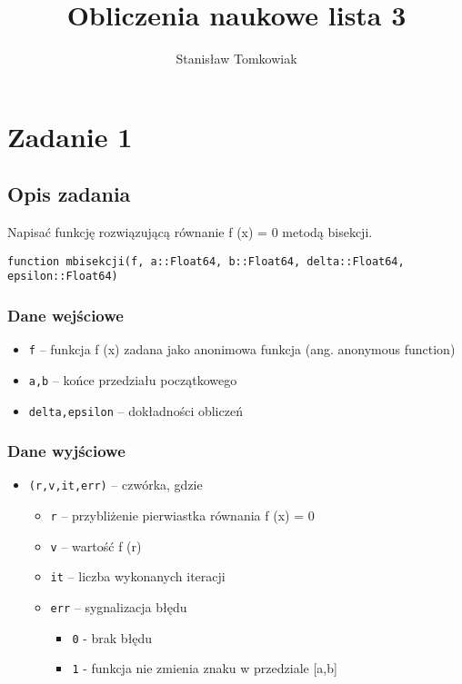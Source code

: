 \documentclass{article}
\title{Obliczenia naukowe lista 3}
\author{Stanisław Tomkowiak}
\begin{document}
\maketitle


\section*{Zadanie 1}
\subsection*{Opis zadania}
Napisać funkcję rozwiązującą równanie f (x) = 0 metodą bisekcji.

\texttt{function mbisekcji(f, a::Float64, b::Float64, delta::Float64, epsilon::Float64)}
\subsubsection*{Dane wejściowe}
\begin{itemize}
    \item \texttt{f} – funkcja f (x) zadana jako anonimowa funkcja (ang. anonymous function)
    \item \texttt{a,b} – końce przedziału początkowego
    \item \texttt{delta,epsilon} – dokładności obliczeń
\end{itemize}
\subsubsection*{Dane wyjściowe}
\begin{itemize}
    \item \texttt{(r,v,it,err)} – czwórka, gdzie
    \begin{itemize}
        \item \texttt{r} – przybliżenie pierwiastka równania f (x) = 0
        \item \texttt{v} – wartość f (r)
        \item \texttt{it} – liczba wykonanych iteracji
        \item \texttt{err} – sygnalizacja błędu
        \begin{itemize}
            \item \texttt{0} - brak błędu
            \item \texttt{1} - funkcja nie zmienia znaku w przedziale [a,b]
        \end{itemize}
    \end{itemize}
\end{itemize}
\end{document}
